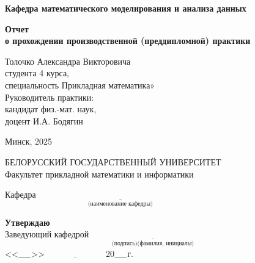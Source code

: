 \begin{titlepage}
    \begin{center}
        \textbf{
        Кафедра математического моделирования и анализа данных
        }

        \vspace{4cm}
        \textbf{Отчет\\[0.4cm]
        о прохождении производственной (преддипломной) практики
        }
    \end{center}

    \vfill

    \begin{flushleft}
        \begin{adjustwidth}{7.2cm}{}
            Толочко Александра Викторовича\\[0.3cm]
            студента 4 курса,\\
            специальность Прикладная математика»\\[0.4cm]
            Руководитель практики:\\[0.3cm] 
            кандидат физ.-мат. наук,\\
            доцент И.А. Бодягин
        \end{adjustwidth}
    \end{flushleft}

    \vfill

    \begin{center}
        Минск, 2025
    \end{center}
\end{titlepage}

\begin{center}
    БЕЛОРУССКИЙ ГОСУДАРСТВЕННЫЙ УНИВЕРСИТЕТ\\[0.2cm]
    Факультет прикладной математики и информатики\\[0.2cm]
\end{center}
Кафедра $\underset{\text{(наименование кафедры)}}{\underline{\hspace{8cm}}}$

\vspace{1cm}
\hspace*{8cm}\textbf{Утверждаю}\\[0.2cm]
\hspace*{5cm}Заведующий кафедрой $\underset{\text{(подпись)(фамилия, инициалы)}}{\underline{\hspace{6cm}}}$\\[0.6cm]
\hspace*{10.8cm}<<$\underline{\hspace{0.5cm}}$>>$\underline{\hspace{3cm}}$20$\underline{\hspace{0.5cm}}$г.

